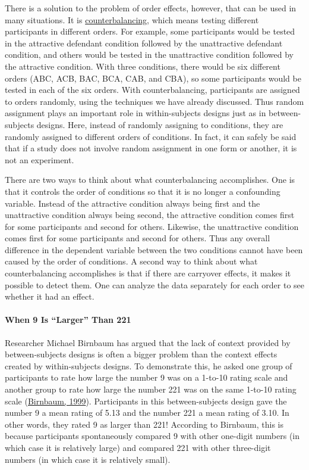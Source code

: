 \documentclass[
]{krantz}
\begin{document}
There is a solution to the problem of order effects, however, that can be used in many situations. It is \protect\hyperlink{counterbalancing}{counterbalancing}, which means testing different participants in different orders. For example, some participants would be tested in the attractive defendant condition followed by the unattractive defendant condition, and others would be tested in the unattractive condition followed by the attractive condition. With three conditions, there would be six different orders (ABC, ACB, BAC, BCA, CAB, and CBA), so some participants would be tested in each of the six orders. With counterbalancing, participants are assigned to orders randomly, using the techniques we have already discussed. Thus random assignment plays an important role in within-subjects designs just as in between-subjects designs. Here, instead of randomly assigning to conditions, they are randomly assigned to different orders of conditions. In fact, it can safely be said that if a study does not involve random assignment in one form or another, it is not an experiment.

There are two ways to think about what counterbalancing accomplishes. One is that it controls the order of conditions so that it is no longer a confounding variable. Instead of the attractive condition always being first and the unattractive condition always being second, the attractive condition comes first for some participants and second for others. Likewise, the unattractive condition comes first for some participants and second for others. Thus any overall difference in the dependent variable between the two conditions cannot have been caused by the order of conditions. A second way to think about what counterbalancing accomplishes is that if there are carryover effects, it makes it possible to detect them. One can analyze the data separately for each order to see whether it had an effect.

\hypertarget{when-9-is-larger-than-221}{%
\paragraph*{When 9 Is ``Larger'' Than 221}\label{when-9-is-larger-than-221}}

Researcher Michael Birnbaum has argued that the lack of context provided by between-subjects designs is often a bigger problem than the context effects created by within-subjects designs. To demonstrate this, he asked one group of participants to rate how large the number 9 was on a 1-to-10 rating scale and another group to rate how large the number 221 was on the same 1-to-10 rating scale (\protect\hyperlink{ref-birnbaum1999show}{Birnbaum, 1999}). Participants in this between-subjects design gave the number 9 a mean rating of 5.13 and the number 221 a mean rating of 3.10. In other words, they rated 9 as larger than 221! According to Birnbaum, this is because participants spontaneously compared 9 with other one-digit numbers (in which case it is relatively large) and compared 221 with other three-digit numbers (in which case it is relatively small).
\end{document}
